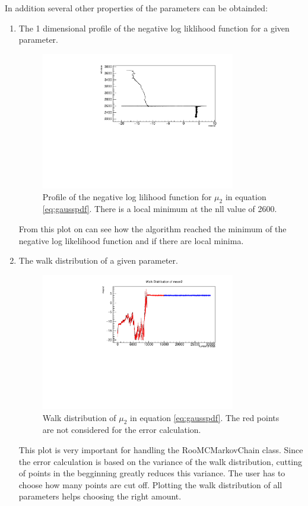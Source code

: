 \documentclass[english]{uzhpub}
\begin{document}
In addition several other properties of the parameters can be obtainded:
\begin{enumerate}
  \item The 1 dimensional profile of the negative log liklihood function for a given parameter.
  \begin{figure}[H]
    \centering
    \includegraphics[width=0.8\textwidth]{RooMCMC/walkProfile}
    \caption{Profile of the negative log lilihood function for $\mu_2$ in equation \ref{eq:gausspdf}. There is a local minimum at the nll value of 2600.}
    \label{fig:profile}
  \end{figure}
  From this plot on can see how the algorithm reached the minimum of the negative log likelihood function and if there are local minima. \\


  \item The walk distribution of a given parameter.
  \begin{figure}[H]
    \centering
    \includegraphics[width=0.8\textwidth]{RooMCMC/walkDis}
    \caption{Walk distribution of $\mu_2$ in equation \ref{eq:gausspdf}. The red points are not considered for the error calculation.}
    \label{fig:walkDis}
  \end{figure}
  This plot is very important for handling the RooMCMarkovChain class. Since the error calculation is based on the variance of the walk distribution, cutting of points in the begginning greatly reduces this variance. The user has to choose how many points are cut off. Plotting the walk distribution of all parameters helps choosing the right amount. \\


\end{enumerate}
\end{document}
